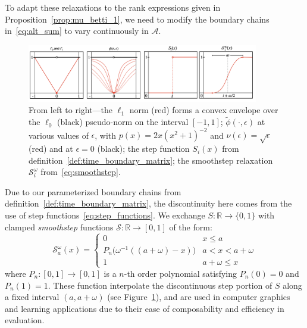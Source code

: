 \documentclass[10pt]{article}
\numberwithin{equation}{section}
\newcommand{\+}{%
	\raisebox{0.18ex}{\scaleobj{0.55}{+}}
}
\theoremstyle{definition}
\theoremstyle{definition}
\begin{document}
\noindent To adapt these relaxations to the rank expressions given in Proposition~\ref{prop:mu_betti_1}, we need to modify the boundary chains in~\eqref{eq:alt_sum} to vary continuously in $\mathcal{A}$.
\begin{figure}
\centering
	\includegraphics[width=0.90\textwidth]{cont_relax}
	\caption{From left to right---the $\ell_1$ norm (red) forms a convex envelope over the $\ell_0$ (black) pseudo-norm on the interval $[-1, 1]$; 
	$\tilde{\phi}(\cdot, \epsilon)$ at various values of $\epsilon$, with $p(x) = 2x (x^2 + 1)^{-2}$ and $\nu(\epsilon) = \sqrt{\epsilon}$ (red) and at $\epsilon = 0$ (black); 
	the step function $S_i(x)$ from definition~\ref{def:time_boundary_matrix}; 
	the smoothstep relaxation $\mathcal{S}_i^{\omega}$ from~\eqref{eq:smoothstep}.
	}
	\label{fig:smoothstep}
\end{figure}
Due to our parameterized boundary chains from definition~\ref{def:time_boundary_matrix}, the discontinuity here comes from the use of step functions~\eqref{eq:step_functions}. 
We exchange $S : \mathbb{R} \to \{ 0, 1\}$ with clamped \emph{smoothstep} functions $\mathcal{S}: \mathbb{R} \to [0, 1]$ of the form: 
\begin{equation}\label{eq:smoothstep}
\mathcal{S}_a^{\omega} (x) = \begin{cases}
	0 & x \leq a \\
	P_n\big( \omega^{-1}((a + \omega) - x) \big) & a < x < a + \omega \\
	1 & a + \omega \leq x
\end{cases}
\end{equation} 
where $P_n: [0,1] \to [0,1]$ is a $n$-th order polynomial satisfying $P_n(0) = 0$ and $P_n(1) = 1$.
These function interpolate the discontinuous step portion of $S$ along a fixed interval $(a,a+\omega)$ (see Figure~\ref{fig:smoothstep}), and are used in computer graphics and learning applications due to their ease of composability and efficiency in evaluation. 
\end{document}
